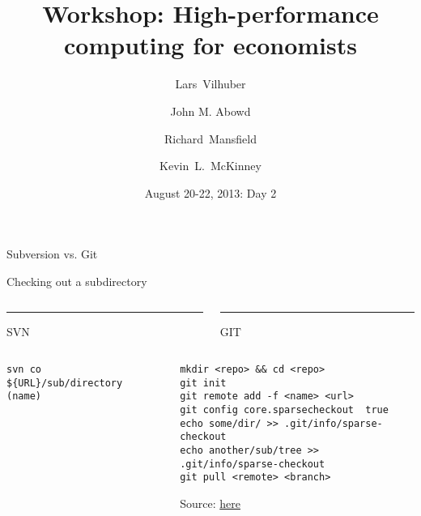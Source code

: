 \documentclass[xcolor=table,compress]{beamer}
\title[Computing for Economists]{Workshop: High-performance computing for economists}
\author[Vilhuber, Abowd, Mansfield, McKinney]{%
  Lars~Vilhuber\inst{1} \and
  John M. Abowd\inst{1} \and
  Richard~Mansfield\inst{1} \and
  Kevin~L.~McKinney %
}
\institute[Cornell]{
  \inst{1}%
   Cornell University, Economics Department,
}%
\date[August 20-22, 2013]{August 20-22, 2013: Day 2}
\begin{document}
\frame{\titlepage}

\begin{frame}[fragile]{Subversion vs. Git}
\small
\lstset{numbers=left, stepnumber=1,  language=bash, basicstyle=\tiny}

\begin{block}{Checking out a subdirectory}
\begin{columns}
\begin{column}{.48\textwidth}
\color{red}\rule{\linewidth}{4pt}

SVN
\end{column}%
\hfill%
\begin{column}{.48\textwidth}
\color{blue}\rule{\linewidth}{4pt}

GIT
\end{column}%
\end{columns}
\begin{columns}
\begin{column}{.48\textwidth}
\color{red}
\begin{lstlisting}
svn co ${URL}/sub/directory (name)
\end{lstlisting}
\end{column}%
\hfill%
\begin{column}{.48\textwidth}
\color{blue}\tiny
\begin{lstlisting}
mkdir <repo> && cd <repo>
git init
git remote add -f <name> <url>
git config core.sparsecheckout  true
echo some/dir/ >> .git/info/sparse-checkout
echo another/sub/tree >>  .git/info/sparse-checkout
git pull <remote> <branch>
\end{lstlisting}
{\tiny Source: \href{http://jasonkarns.com/blog/subdirectory-checkouts-with-git-sparse-checkout/}{here}}
\end{column}%

\end{columns}
\end{block}
\end{frame}
\end{document}
